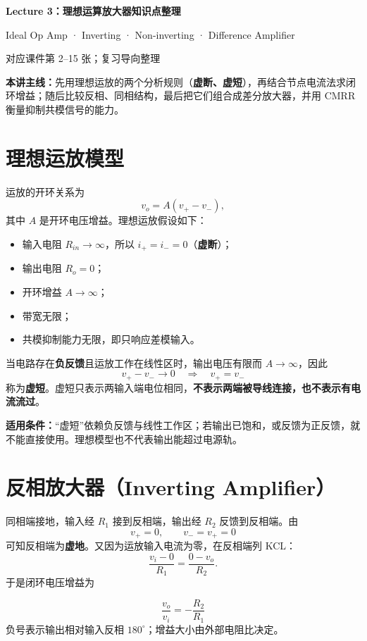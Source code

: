 \documentclass[11pt,fontset=none]{ctexart}
\newcommand{\vo}{v_o}
\newcommand{\vi}{v_i}
\newcommand{\vp}{v_+}
\newcommand{\vn}{v_-}
\begin{document}
\begin{center}
  {\LARGE\bfseries Lecture 3：理想运算放大器知识点整理}\par
  \vspace{0.4em}
  {\large Ideal Op Amp · Inverting · Non-inverting · Difference Amplifier}\par
  \vspace{0.3em}
  {\small 对应课件第 2--15 张；复习导向整理}
\end{center}

\begin{keybox}
\textbf{本讲主线：}先用理想运放的两个分析规则（\textbf{虚断、虚短}），再结合节点电流法求闭环增益；随后比较反相、同相结构，最后把它们组合成差分放大器，并用 CMRR 衡量抑制共模信号的能力。
\end{keybox}

\section{理想运放模型}

运放的开环关系为
\[
  \vo=A(\vp-\vn),
\]
其中 $A$ 是开环电压增益。理想运放假设如下：
\begin{itemize}
  \item 输入电阻 $R_{in}\to\infty$，所以 $i_+=i_-=0$（\textbf{虚断}）；
  \item 输出电阻 $R_o=0$；
  \item 开环增益 $A\to\infty$；
  \item 带宽无限；
  \item 共模抑制能力无限，即只响应差模输入。
\end{itemize}

当电路存在\textbf{负反馈}且运放工作在线性区时，输出电压有限而 $A\to\infty$，因此
\[
  \vp-\vn\to 0 \quad\Rightarrow\quad \vp=\vn
\]
称为\textbf{虚短}。虚短只表示两输入端电位相同，\textbf{不表示两端被导线连接，也不表示有电流流过}。

\begin{warnbox}
\textbf{适用条件：}“虚短”依赖负反馈与线性工作区；若输出已饱和，或反馈为正反馈，就不能直接使用。理想模型也不代表输出能超过电源轨。
\end{warnbox}

\section{反相放大器（Inverting Amplifier）}

同相端接地，输入经 $R_1$ 接到反相端，输出经 $R_2$ 反馈到反相端。由
\[
  \vp=0,\qquad \vn=\vp=0
\]
可知反相端为\textbf{虚地}。又因为运放输入电流为零，在反相端列 KCL：
\[
  \frac{\vi-0}{R_1}=\frac{0-\vo}{R_2}.
\]
于是闭环电压增益为
\begin{keybox}
\[
  \boxed{\frac{\vo}{\vi}=-\frac{R_2}{R_1}}
\]
负号表示输出相对输入反相 $180^\circ$；增益大小由外部电阻比决定。
\end{keybox}
\end{document}
